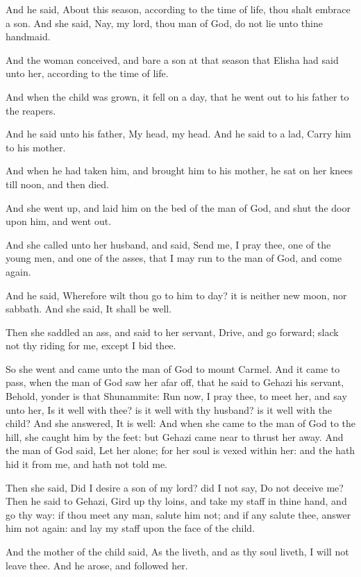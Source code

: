 \verse And he said, About this season, according to the time of life, thou shalt embrace a son. And she said, Nay, my lord, thou man of God, do not lie unto thine handmaid.

\verse And the woman conceived, and bare a son at that season that Elisha had said unto her, according to the time of life.

\verse And when the child was grown, it fell on a day, that he went out to his father to the reapers.

\verse And he said unto his father, My head, my head. And he said to a lad, Carry him to his mother.

\verse And when he had taken him, and brought him to his mother, he sat on her knees till noon, and then died.

\verse And she went up, and laid him on the bed of the man of God, and shut the door upon him, and went out.

\verse And she called unto her husband, and said, Send me, I pray thee, one of the young men, and one of the asses, that I may run to the man of God, and come again.

\verse And he said, Wherefore wilt thou go to him to day? it is neither new moon, nor sabbath. And she said, It shall be well.

\verse Then she saddled an ass, and said to her servant, Drive, and go forward; slack not thy riding for me, except I bid thee.

\verse So she went and came unto the man of God to mount Carmel. And it came to pass, when the man of God saw her afar off, that he said to Gehazi his servant, Behold, yonder is that Shunammite: \verse Run now, I pray thee, to meet her, and say unto her, Is it well with thee? is it well with thy husband? is it well with the child? And she answered, It is well: \verse And when she came to the man of God to the hill, she caught him by the feet: but Gehazi came near to thrust her away. And the man of God said, Let her alone; for her soul is vexed within her: and the \LORD hath hid it from me, and hath not told me.

\verse Then she said, Did I desire a son of my lord? did I not say, Do not deceive me?  \verse Then he said to Gehazi, Gird up thy loins, and take my staff in thine hand, and go thy way: if thou meet any man, salute him not; and if any salute thee, answer him not again: and lay my staff upon the face of the child.

\verse And the mother of the child said, As the \LORD liveth, and as thy soul liveth, I will not leave thee. And he arose, and followed her.

